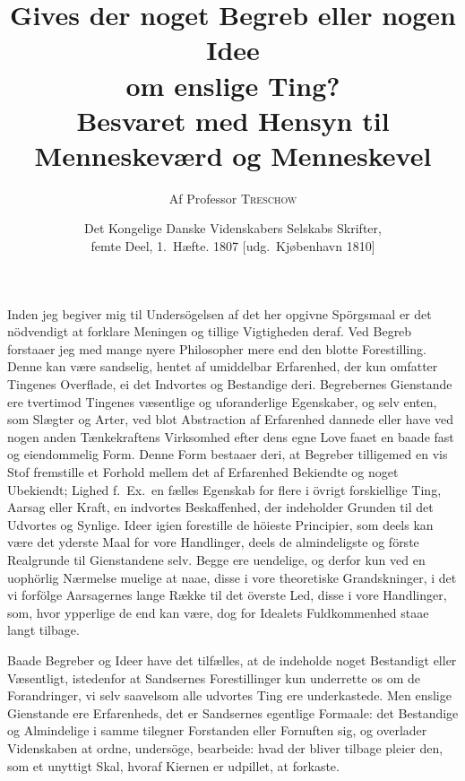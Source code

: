 \documentclass[12pt,a4paper]{article}
\title{\textbf{Gives der noget Begreb eller nogen Idee\\ om enslige Ting?}\\[6pt]
       \large Besvaret med Hensyn til\\[4pt]
       \large Menneskeværd og Menneskevel}
\author{Af Professor \textsc{Treschow}}
\date{\small Det Kongelige Danske Videnskabers Selskabs Skrifter,\\
      femte Deel, 1.~Hæfte. 1807 [udg.\ Kjøbenhavn 1810]}
\newcommand{\opage}[1]{\marginnote{\footnotesize\textit{[#1]}}}
\begin{document}
\maketitle
\thispagestyle{fancy}

\bigskip


\opage{225} Inden jeg begiver mig til Undersögelsen af det her opgivne Spörgsmaal
er det nödvendigt at forklare Meningen og tillige Vigtigheden deraf.
Ved Begreb forstaaer jeg med mange nyere Philosopher mere end den blotte
Forestilling. Denne kan være sandselig, hentet af umiddelbar Erfarenhed,
der kun omfatter Tingenes Overflade, ei det Indvortes og Bestandige deri.
Begrebernes Gienstande ere tvertimod Tingenes væsentlige og uforanderlige
Egenskaber, og selv enten, som Slægter og Arter, ved blot Abstraction af
Erfarenhed dannede eller have ved nogen anden Tænkekraftens Virksomhed
efter dens egne Love faaet en baade fast og eiendommelig Form. Denne Form
bestaaer deri, at Begreber tilligemed en vis Stof fremstille et Forhold
mellem det af Erfarenhed Bekiendte og noget Ubekiendt; Lighed f.~Ex.\ en
fælles Egenskab for flere i övrigt forskiellige Ting, Aarsag eller Kraft,
en indvortes Beskaffenhed, der indeholder Grunden
\opage{226} til det Udvortes og Synlige. Ideer igien forestille de höieste
Principier, som deels kan være det yderste Maal for vore Handlinger,
deels de almindeligste og förste Realgrunde til Gienstandene selv. Begge
ere uendelige, og derfor kun ved en uophörlig Nærmelse muelige at naae,
disse i vore theoretiske Grandskninger, i det vi forfölge Aarsagernes
lange Række til det överste Led, disse i vore Handlinger, som, hvor
ypperlige de end kan være, dog for Idealets Fuldkommenhed staae langt
tilbage.

Baade Begreber og Ideer have det tilfælles, at de indeholde noget
Bestandigt eller Væsentligt, istedenfor at Sandsernes Forestillinger kun
underrette os om de Forandringer, vi selv saavelsom alle udvortes Ting
ere underkastede. Men enslige Gienstande ere Erfarenheds, det er
Sandsernes egentlige Formaale: det Bestandige og Almindelige i samme
tilegner Forstanden eller Fornuften sig, og overlader Videnskaben at
ordne, undersöge, bearbeide: hvad der bliver tilbage pleier den, som et
unyttigt Skal, hvoraf Kiernen er udpillet, at forkaste.
\end{document}
